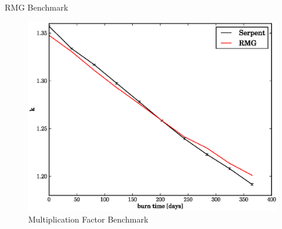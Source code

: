 \documentclass[pdf, autumn, slideColor, nocolorBG]{prosper}
\begin{document}
\begin{slide}{RMG Benchmark}
\begin{center}
\begin{figure}
\caption{Multiplication Factor Benchmark}
\includegraphics[scale=0.4]{../multigroup_method/figs/benchmark/k.eps}
\end{figure}
\end{center}
\end{slide}
\end{document}

